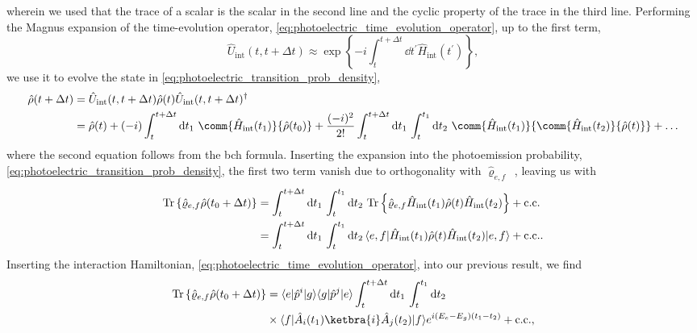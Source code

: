 wherein we used that the trace of a scalar is the scalar in the second line and the cyclic property of the trace in the third line.
Performing the Magnus expansion of the time-evolution operator, \cref{eq:photoelectric_time_evolution_operator}, up to the first term,
\begin{equation}
	\hat{U}_\text{int}(t,t+\Delta t)
	\approx
	\exp\left\{
		-i
		\int_t^{t+\Delta t}\dd{t^\prime}
		\hat{H}_\text{int}(t^\prime)
	\right\}
	,
\end{equation}
we use it to evolve the state in \cref{eq:photoelectric_transition_prob_density},
\begin{equation}
	\begin{split}
		\hat\rho(t+\Delta t)
		&=
		\hat{U}_\text{int}(t,t+\Delta t)
		\hat\rho(t)
		\hat{U}_\text{int}(t,t+\Delta t)^\dagger
		\\
		&=
		\hat\rho(t)
		+
		(-i)
		\int_t^{t+\Delta t}\dd{t_1}
		\comm{\hat{H}_\text{int}(t_1)}{\hat\rho(t_0)}
		+
		\frac{(-i)^2}{2!}
		\int_{t}^{t+\Delta t}\dd{t_1}
		\int_{t}^{t_1}\dd{t_2}
		\comm{\hat{H}_\text{int}(t_1)}{\comm{\hat{H}_\text{int}(t_2)}{\hat\rho(t)}}
		+
		\dots
	\end{split}
\end{equation}
where the second equation follows from the \gls{bch} formula.
Inserting the expansion into the photoemission probability, \cref{eq:photoelectric_transition_prob_density}, the first two term vanish due to orthogonality with $\hat\varrho_{e,f}$~\cite[p.~686]{Mandel1995}, leaving us with
\begin{equation}
	\begin{split}
		\trace\left\{
			\hat\varrho_{e,f}
			\hat\rho(t_0+\Delta t)
		\right\}
		&=
		\int_t^{t+\Delta t}\dd{t_1}
		\int_t^{t_1}
		\dd{t_2}
		\trace\left\{
			\hat\varrho_{e,f}
			\hat{H}_\text{int}(t_1)
			\hat\rho(t)
			\hat{H}_\text{int}(t_2)
		\right\}
		+
		\text{c.c.}
		\\
		&=
		\int_t^{t+\Delta t}\dd{t_1}
		\int_t^{t_1}
		\dd{t_2}
		\bra{e,f}
			\hat{H}_\text{int}(t_1)
			\hat\rho(t)
			\hat{H}_\text{int}(t_2)
		\ket{e,f}
		+
		\text{c.c.}
		.
	\end{split}
\end{equation}
Inserting the interaction Hamiltonian, \cref{eq:photoelectric_time_evolution_operator}, into our previous result, we find~\cite[p.~693]{Mandel1995}
\begin{equation}
	\begin{split}
		\trace\left\{
			\hat\varrho_{e,f}
			\hat\rho(t_0+\Delta t)
		\right\}
		&=
		\bra{e}\hat{p}^i\ket{g}
		\bra{g}\hat{p}^j\ket{e}
		\int_t^{t+\Delta t}\dd{t_1}
		\int_t^{t_1}
		\dd{t_2}
		\\
		&\times
		\bra{f}
			\hat{A}_i(t_1)
			\ketbra{i}
			\hat{A}_j(t_2)
		\ket{f}
		e^{i(E_e-E_g)(t_1-t_2)}
		+
		\text{c.c.}
		,
	\end{split}	
\end{equation}
